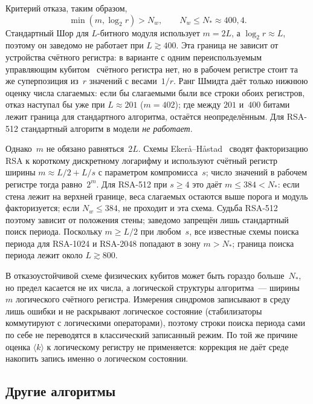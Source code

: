 \documentclass[11pt,a4paper]{article}
\begin{document}
Критерий отказа, таким образом,
\begin{equation}
\min(m,\log_2 r)>N_w,\qquad N_w\le N_*\approx400{,}4.
\end{equation}
Стандартный Шор для $L$-битного модуля использует $m=2L$, а $\log_2 r\approx L$, поэтому он заведомо не работает при $L\gtrsim400$. Эта граница не зависит от устройства счётного регистра: в варианте с одним переиспользуемым управляющим кубитом~\cite{beauregard2003} счётного регистра нет, но в рабочем регистре стоит та же суперпозиция из~$r$ значений с весами~$1/r$. Ранг Шмидта даёт только нижнюю оценку числа слагаемых: если бы слагаемыми были все строки обоих регистров, отказ наступал бы уже при $L\approx201$ ($m=402$); где между $201$ и~$400$ битами лежит граница для стандартного алгоритма, остаётся неопределённым. Для RSA-512 стандартный алгоритм в модели \emph{не работает}.

Однако~$m$ не обязано равняться~$2L$. Схемы Ekerå--Håstad~\cite{ekera2017} сводят факторизацию RSA к короткому дискретному логарифму и используют счётный регистр ширины $m\approx L/2+L/s$ с параметром компромисса~$s$; число значений в рабочем регистре тогда равно~$2^m$. Для RSA-512 при $s\ge4$ это даёт $m\le384<N_*$: если стена лежит на верхней границе, веса слагаемых остаются выше порога и модуль факторизуется; если $N_w\le384$, не проходит и эта схема. Судьба RSA-512 поэтому зависит от положения стены; заведомо запрещён лишь стандартный поиск периода. Поскольку $m\ge L/2$ при любом~$s$, все известные схемы поиска периода для RSA-1024 и RSA-2048 попадают в зону $m>N_*$; граница поиска периода лежит около $L\gtrsim800$.

В отказоустойчивой схеме физических кубитов может быть гораздо больше~$N_*$, но предел касается не их числа, а логической структуры алгоритма~--- ширины~$m$ логического счётного регистра. Измерения синдромов записывают в среду лишь ошибки и не раскрывают логическое состояние (стабилизаторы коммутируют с логическими операторами), поэтому строки поиска периода сами по себе не переводятся в классический записанный режим. По той же причине оценка $\langle k\rangle$ к логическому регистру не применяется: коррекция не даёт среде накопить запись именно о логическом состоянии.

\subsection{Другие алгоритмы}
\label{sec:other-alg}
\end{document}
